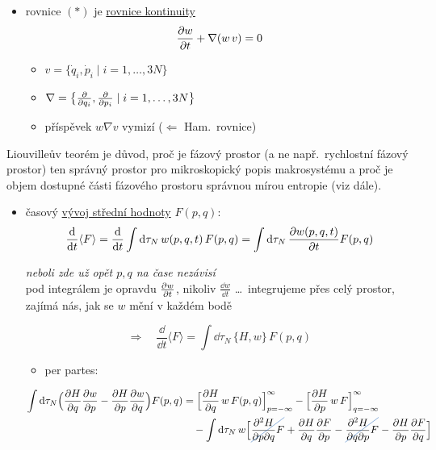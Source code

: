 \begin{minipage}{0.55\textwidth}
\begin{itemize}
  \item rovnice $(*)$ je \underline{rovnice kontinuity}
  \[ \pdv{w}{t} + \nabla(w\,v) = 0 \]
  \begin{itemize}
    \item[$\to$] $v = \{\dot q_i,\dot p_i \mid i = 1,\dots,3N\}$
    \item[$\to$] $\nabla = \big\{\pdv{q_i},\pdv{p_i} \mid i = 1,\dots,3N\big\}$
    \item[$\to$] příspěvek $w\nabla v$ vymizí ($\Leftarrow$ Ham.\ rovnice)
  \end{itemize}
\end{itemize}
\end{minipage}
\hfill
\begin{minipage}{0.42\textwidth}
\begin{tcolorbox}[colback=white,colframe=NavyBlue,boxrule=0.6pt,arc=0pt,left=3pt,right=3pt]
\color{NavyBlue}\small
Liouvilleův teorém je důvod, proč je fázový prostor (a ne např.\ rychlostní fázový prostor) ten správný prostor pro mikroskopický popis makrosystému a proč je objem dostupné části fázového prostoru správnou mírou entropie (viz dále).
\end{tcolorbox}
\end{minipage}

\begin{itemize}
  \item časový \underline{vývoj střední hodnoty} $F(p,q)$:
  \[
    \frac{\dd}{\dd t}\langle F\rangle = \frac{\dd}{\dd t}\int\dd\tau_N\,w(p,q,t)\,F(p,q) = \int\dd\tau_N\,\pdv{w(p,q,t)}{t}F(p,q)
  \]
  \hfill
  \begin{minipage}{0.45\textwidth}
  {\color{OliveGreen}\small\itshape neboli zde už opět $p,q$ na čase nezávisí} \\
  {\color{NavyBlue}\small pod integrálem je opravdu $\pdv{w}{t}$, nikoliv $\frac{\dd w}{\dd t}$ \dots\ integrujeme přes celý prostor, zajímá nás, jak se $w$ mění v každém bodě}
  \end{minipage}
  \[
    \Rightarrow\quad \frac{\dd}{\dd t}\langle F\rangle = \int\dd\tau_N\,\{H,w\}\,F(p,q)
  \]
  \begin{itemize}
    \item per partes:
  \end{itemize}
  \begin{align*}
    \int\dd\tau_N\Big(\pdv{H}{q}\pdv{w}{p} - \pdv{H}{p}\pdv{w}{q}\Big)F(p,q)
    &= \Big[\pdv{H}{q}\,w\,F(p,q)\Big]_{p=-\infty}^{\infty} - \Big[\pdv{H}{p}\,w\,F\Big]_{q=-\infty}^{\infty} \\
    &\quad - \int\dd\tau_N\,w\Big[\skrt{\frac{\partial^2H}{\partial p\partial q}F} + \pdv{H}{q}\pdv{F}{p}
       - \skrt{\frac{\partial^2H}{\partial q\partial p}F} - \pdv{H}{p}\pdv{F}{q}\Big]
  \end{align*}
\end{itemize}

